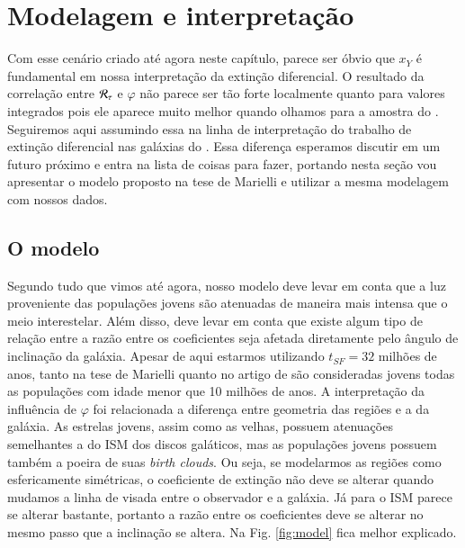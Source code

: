 \section{Modelagem e interpretação}
\label{sec:difextin:modeleinterp}

Com esse cenário criado até agora neste capítulo, parece ser óbvio que $x_Y$ é fundamental em nossa
interpretação da extinção diferencial. O resultado da correlação entre $\mathcal{R}_\tau$ e $\varphi$
não parece ser tão forte localmente quanto para valores integrados pois ele aparece muito melhor
quando olhamos para a amostra do \SDSS. Seguiremos aqui assumindo essa na linha de interpretação do
trabalho de extinção diferencial nas galáxias do \SDSS. Essa diferença esperamos discutir em um
futuro próximo e entra na lista de coisas para fazer, portando nesta seção vou apresentar o modelo
proposto na tese de Marielli e utilizar a mesma modelagem com nossos dados.

\subsection{O modelo}
\label{sec:difextin:modeleinterp:model}

Segundo tudo que vimos até agora, nosso modelo deve levar em conta que a luz proveniente das
populações jovens são atenuadas de maneira mais intensa que o meio interestelar. Além disso, deve
levar em conta que existe algum tipo de relação entre a razão entre os coeficientes seja afetada
diretamente pelo ângulo de inclinação da galáxia. Apesar de aqui estarmos utilizando $t_{SF} = 32$
milhões de anos, tanto na tese de Marielli quanto no artigo de \citet{Charlot.Fall.2000a} são
consideradas jovens todas as populações com idade menor que 10 milhões de anos. A interpretação da
influência de $\varphi$ foi relacionada a diferença entre geometria das regiões \Hii e a da galáxia.
As estrelas jovens, assim como as velhas, possuem atenuações semelhantes a do ISM dos discos
galáticos, mas as populações jovens possuem também a poeira de suas {\em birth clouds}. Ou seja, se
modelarmos as regiões \Hii como esfericamente simétricas, o coeficiente de extinção não
deve se alterar quando mudamos a linha de visada entre o observador e a galáxia. Já para o ISM
parece se alterar bastante, portanto a razão entre os coeficientes deve se alterar no mesmo passo
que a inclinação se altera. Na Fig. \ref{fig:model} fica melhor explicado.

